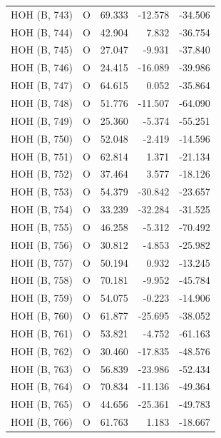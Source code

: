 \begin{longtable}{@{}lcrr@{}}
  \cmidrule(r){1-5}
  HOH (B, 743) & O & 69.333 & -12.578 & -34.506 \\
  \cmidrule(r){1-5}
  HOH (B, 744) & O & 42.904 & 7.832 & -36.754 \\
  \cmidrule(r){1-5}
  HOH (B, 745) & O & 27.047 & -9.931 & -37.840 \\
  \cmidrule(r){1-5}
  HOH (B, 746) & O & 24.415 & -16.089 & -39.986 \\
  \cmidrule(r){1-5}
  HOH (B, 747) & O & 64.615 & 0.052 & -35.864 \\
  \cmidrule(r){1-5}
  HOH (B, 748) & O & 51.776 & -11.507 & -64.090 \\
  \cmidrule(r){1-5}
  HOH (B, 749) & O & 25.360 & -5.374 & -55.251 \\
  \cmidrule(r){1-5}
  HOH (B, 750) & O & 52.048 & -2.419 & -14.596 \\
  \cmidrule(r){1-5}
  HOH (B, 751) & O & 62.814 & 1.371 & -21.134 \\
  \cmidrule(r){1-5}
  HOH (B, 752) & O & 37.464 & 3.577 & -18.126 \\
  \cmidrule(r){1-5}
  HOH (B, 753) & O & 54.379 & -30.842 & -23.657 \\
  \cmidrule(r){1-5}
  HOH (B, 754) & O & 33.239 & -32.284 & -31.525 \\
  \cmidrule(r){1-5}
  HOH (B, 755) & O & 46.258 & -5.312 & -70.492 \\
  \cmidrule(r){1-5}
  HOH (B, 756) & O & 30.812 & -4.853 & -25.982 \\
  \cmidrule(r){1-5}
  HOH (B, 757) & O & 50.194 & 0.932 & -13.245 \\
  \cmidrule(r){1-5}
  HOH (B, 758) & O & 70.181 & -9.952 & -45.784 \\
  \cmidrule(r){1-5}
  HOH (B, 759) & O & 54.075 & -0.223 & -14.906 \\
  \cmidrule(r){1-5}
  HOH (B, 760) & O & 61.877 & -25.695 & -38.052 \\
  \cmidrule(r){1-5}
  HOH (B, 761) & O & 53.821 & -4.752 & -61.163 \\
  \cmidrule(r){1-5}
  HOH (B, 762) & O & 30.460 & -17.835 & -48.576 \\
  \cmidrule(r){1-5}
  HOH (B, 763) & O & 56.839 & -23.986 & -52.434 \\
  \cmidrule(r){1-5}
  HOH (B, 764) & O & 70.834 & -11.136 & -49.364 \\
  \cmidrule(r){1-5}
  HOH (B, 765) & O & 44.656 & -25.361 & -49.783 \\
  \cmidrule(r){1-5}
  HOH (B, 766) & O & 61.763 & 1.183 & -18.667 \\

\end{longtable}
